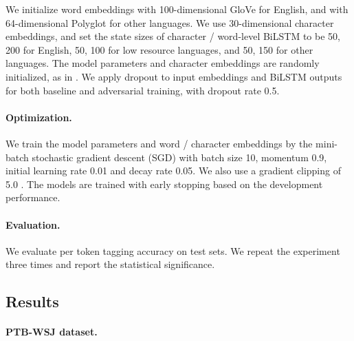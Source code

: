 \documentclass[11pt,a4paper]{article}
\begin{document}
We initialize word embeddings with 100-dimensional GloVe \cite{pennington-socher-manning:2014:EMNLP2014} for English, and with 64-dimensional Polyglot \cite{polyglot:2013:ACL-CoNLL} for other languages.
We use 30-dimensional character embeddings, and set the state sizes of character \!/\! word-level BiLSTM to be 50, 200  for English, 50, 100 for low resource languages, and 50, 150 for other languages. The model parameters and character embeddings are randomly initialized, 
as in
.
We apply dropout \cite{JMLR:v15:srivastava14a} to input embeddings and BiLSTM outputs for both baseline and adversarial training, with dropout rate 0.5.


\paragraph{Optimization.}
We train the model parameters and word \!/\! character embeddings by the mini-batch stochastic gradient descent (SGD) with batch size 10, momentum 0.9, initial learning rate 0.01 and decay rate 0.05. 
We also use a gradient clipping of 5.0 \cite{Pascanu2012}.
The models are trained with
early stopping \cite{caruana2001overfitting} based on the development performance.



\paragraph{Evaluation.}
We evaluate 
per token tagging accuracy on test sets. 
We repeat the experiment three times and report the statistical significance.

\subsection{Results}
\paragraph{PTB-WSJ dataset.}
\end{document}
